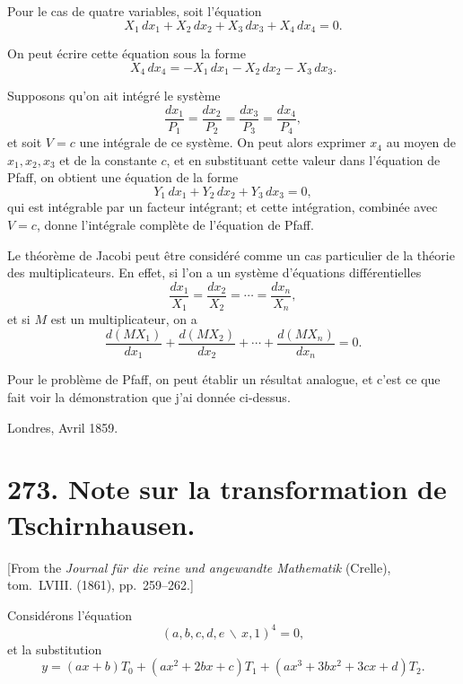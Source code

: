 \documentclass[11pt,a4paper]{article}
\theoremstyle{definition}
\begin{document}
Pour le cas de quatre variables, soit l'\'{e}quation
\[X_{1}\,dx_{1} + X_{2}\,dx_{2} + X_{3}\,dx_{3} + X_{4}\,dx_{4} = 0.\]

On peut \'{e}crire cette \'{e}quation sous la forme
\[X_{4}\,dx_{4} = -X_{1}\,dx_{1} - X_{2}\,dx_{2} - X_{3}\,dx_{3}.\]

Supposons qu'on ait int\'{e}gr\'{e} le syst\`{e}me
\[\frac{dx_{1}}{P_{1}} = \frac{dx_{2}}{P_{2}} = \frac{dx_{3}}{P_{3}} = \frac{dx_{4}}{P_{4}},\]
et soit $V = c$ une int\'{e}grale de ce syst\`{e}me. On peut alors exprimer $x_{4}$ au moyen
de $x_{1}, x_{2}, x_{3}$ et de la constante $c$, et en substituant cette valeur dans l'\'{e}quation
de Pfaff, on obtient une \'{e}quation de la forme
\[Y_{1}\,dx_{1} + Y_{2}\,dx_{2} + Y_{3}\,dx_{3} = 0,\]
qui est int\'{e}grable par un facteur int\'{e}grant; et cette int\'{e}gration, combin\'{e}e avec
$V = c$, donne l'int\'{e}grale compl\`{e}te de l'\'{e}quation de Pfaff.

Le th\'{e}or\`{e}me de Jacobi peut \^{e}tre consid\'{e}r\'{e} comme un cas particulier de la
th\'{e}orie des multiplicateurs. En effet, si l'on a un syst\`{e}me d'\'{e}quations
diff\'{e}rentielles
\[\frac{dx_{1}}{X_{1}} = \frac{dx_{2}}{X_{2}} = \cdots = \frac{dx_{n}}{X_{n}},\]
et si $M$ est un multiplicateur, on a
\[\frac{d(MX_{1})}{dx_{1}} + \frac{d(MX_{2})}{dx_{2}} + \cdots + \frac{d(MX_{n})}{dx_{n}} = 0.\]

Pour le probl\`{e}me de Pfaff, on peut \'{e}tablir un r\'{e}sultat analogue, et c'est ce
que fait voir la d\'{e}monstration que j'ai donn\'{e}e ci-dessus.

\begin{flushright}
Londres, Avril 1859.
\end{flushright}

\newpage
\section*{273. Note sur la transformation de Tschirnhausen.}

[From the \textit{Journal f\"{u}r die reine und angewandte Mathematik} (Crelle),
tom.~LVIII. (1861), pp.~259--262.]
\vspace{0.5em}

Consid\'{e}rons l'\'{e}quation
\[(a,b,c,d,e\,\backslash\!\!\,x,1)^{4} = 0,\]
et la substitution
\[y = (ax+b)T_{0} + (ax^{2}+2bx+c)T_{1} + (ax^{3}+3bx^{2}+3cx+d)T_{2}.\]
\end{document}
